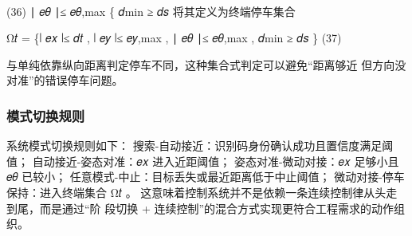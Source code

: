 \paragraph{} (36)
∣ 𝑒𝜃 ∣≤ 𝑒𝜃,max
\{ 𝑑min ≥ 𝑑𝑠
将其定义为终端停车集合

Ω𝑡 = \{∣ 𝑒𝑥 ∣≤ 𝑑𝑡 , ∣ 𝑒𝑦 ∣≤ 𝑒𝑦,max , ∣ 𝑒𝜃 ∣≤ 𝑒𝜃,max , 𝑑min ≥ 𝑑𝑠 \}   (37)

与单纯依靠纵向距离判定停车不同，这种集合式判定可以避免“距离够近
但方向没对准”的错误停车问题。
\subsubsection{模式切换规则}
系统模式切换规则如下：
搜索-自动接近：识别码身份确认成功且置信度满足阈值；
自动接近-姿态对准：𝑒𝑥 进入近距阈值；
姿态对准-微动对接：𝑒𝑥 足够小且 𝑒𝜃 已较小；
任意模式-中止：目标丢失或最近距离低于中止阈值；
微动对接-停车保持：进入终端集合 Ω𝑡 。
这意味着控制系统并不是依赖一条连续控制律从头走到尾，而是通过“阶
段切换 + 连续控制”的混合方式实现更符合工程需求的动作组织。





